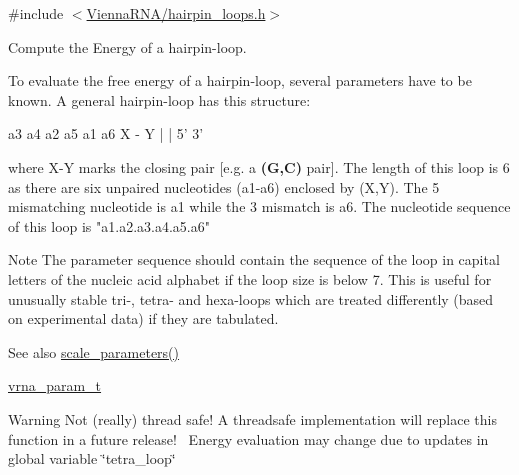 {\ttfamily \#include $<$\hyperlink{hairpin__loops_8h}{Vienna\+R\+N\+A/hairpin\+\_\+loops.\+h}$>$}



Compute the Energy of a hairpin-\/loop. 

To evaluate the free energy of a hairpin-\/loop, several parameters have to be known. A general hairpin-\/loop has this structure\+:~\newline
 
\begin{DoxyPre}
      a3 a4
    a2     a5
    a1     a6
      X - Y
      |   |
      5'  3'
\end{DoxyPre}
 where X-\/Y marks the closing pair \mbox{[}e.\+g. a {\bfseries (G,C)} pair\mbox{]}. The length of this loop is 6 as there are six unpaired nucleotides (a1-\/a6) enclosed by (X,Y). The 5\textquotesingle{} mismatching nucleotide is a1 while the 3\textquotesingle{} mismatch is a6. The nucleotide sequence of this loop is "a1.\+a2.\+a3.\+a4.\+a5.\+a6" ~\newline
 \begin{DoxyNote}{Note}
The parameter sequence should contain the sequence of the loop in capital letters of the nucleic acid alphabet if the loop size is below 7. This is useful for unusually stable tri-\/, tetra-\/ and hexa-\/loops which are treated differently (based on experimental data) if they are tabulated. 
\end{DoxyNote}
\begin{DoxySeeAlso}{See also}
\hyperlink{group__energy__parameters_ga541f2cf7436e9bc939b0a49b24baf987}{scale\+\_\+parameters()} 

\hyperlink{group__energy__parameters_ga8a69ca7d787e4fd6079914f5343a1f35}{vrna\+\_\+param\+\_\+t} 
\end{DoxySeeAlso}
\begin{DoxyWarning}{Warning}
Not (really) thread safe! A threadsafe implementation will replace this function in a future release!~\newline
Energy evaluation may change due to updates in global variable \char`\"{}tetra\+\_\+loop\char`\"{}
\end{DoxyWarning}

